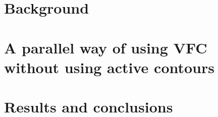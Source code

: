 \documentclass[11pt,a4paper,twoside,openright,titlepage]{book}
\begin{document}
\frontmatter




\cleardoublepage
\setcounter{page}{1}

\cleardoublepage
\setcounter{page}{1}
\tableofcontents

\mainmatter


\part{Background}

\part{A parallel way of using VFC without using active contours}

\part{Results and conclusions}


\backmatter

\listoffigures
\listoftables
\listoflistings
{}

\printbibliography[heading=bibintoc]
\end{document}
